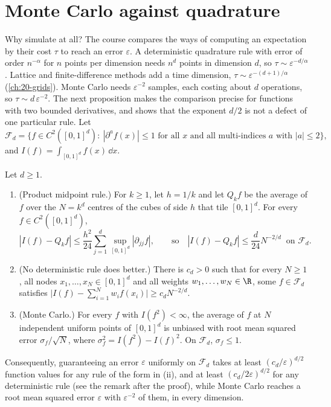 \section{Monte Carlo against quadrature}\label{sec:mc-dimension}

Why simulate at all? The course compares the ways of computing an expectation by their
cost $\tau$ to reach an error $\varepsilon$. A deterministic quadrature rule with error of
order $n^{-\alpha}$ for $n$ points per dimension needs $n^d$ points in dimension $d$, so
$\tau\sim\varepsilon^{-d/\alpha}$. Lattice and finite-difference methods add a time
dimension, $\tau\sim\varepsilon^{-(d+1)/\alpha}$ (\cref{ch:20-grids}). Monte Carlo needs
$\varepsilon^{-2}$ samples, each costing about $d$ operations, so $\tau\sim d\,\varepsilon^{-2}$.
The next proposition makes the comparison precise for functions with two bounded
derivatives, and shows that the exponent $d/2$ is not a defect of one particular rule. Let
\[
  \mathcal F_d=\big\{f\in C^2([0,1]^d):\ |\partial^a f(x)|\le1\text{ for all }x\text{ and all
  multi-indices }a\text{ with }|a|\le2\big\},
\]
and $I(f)=\int_{[0,1]^d}f(x)\,\dd x$.

\begin{proposition}\label{prop:mc-dimension}
Let $d\ge1$.
\begin{enumerate}[label=(\roman*)]
  \item (Product midpoint rule.) For $k\ge1$, let $h=1/k$ and let $Q_kf$ be the average of
    $f$ over the $N=k^d$ centres of the cubes of side $h$ that tile $[0,1]^d$. For every
    $f\in C^2([0,1]^d)$,
    \[
      |I(f)-Q_kf|\le\frac{h^2}{24}\sum_{j=1}^d\sup_{[0,1]^d}|\partial_{jj}f|,
      \qquad\text{so}\quad |I(f)-Q_kf|\le\frac{d}{24}N^{-2/d}\ \text{ on }\mathcal F_d .
    \]
  \item (No deterministic rule does better.) There is $c_d>0$ such that for every $N\ge1$,
    all nodes $x_1,\dots,x_N\in[0,1]^d$ and all weights $w_1,\dots,w_N\in\R$, some
    $f\in\mathcal F_d$ satisfies $\big|I(f)-\sum_{i=1}^Nw_if(x_i)\big|\ge c_dN^{-2/d}$.
  \item (Monte Carlo.) For every $f$ with $I(f^2)<\infty$, the average of $f$ at $N$
    independent uniform points of $[0,1]^d$ is unbiased with root mean squared error
    $\sigma_f/\sqrt N$, where $\sigma_f^2=I(f^2)-I(f)^2$. On $\mathcal F_d$, $\sigma_f\le1$.
\end{enumerate}
Consequently, guaranteeing an error $\varepsilon$ uniformly on $\mathcal F_d$ takes at least
$(c_d/\varepsilon)^{d/2}$ function values for any rule of the form in (ii), and at least
$(c_d/2\varepsilon)^{d/2}$ for any deterministic rule (see the remark after the proof), while Monte Carlo
reaches a root mean squared error $\varepsilon$ with $\varepsilon^{-2}$ of them, in every
dimension.
\end{proposition}

